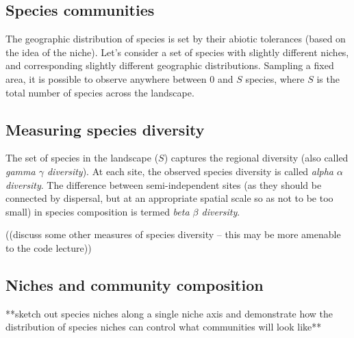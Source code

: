 \documentclass[12pt]{article}
\begin{document}
\clearpage
\subsection*{Species communities}


The geographic distribution of species is set by their abiotic tolerances (based on the idea of the niche). Let's consider a set of species with slightly different niches, and corresponding slightly different geographic distributions. Sampling a fixed area, it is possible to observe anywhere between 0 and $S$ species, where $S$ is the total number of species across the landscape. 













\subsection*{Measuring species diversity}

The set of species in the landscape ($S$) captures the regional diversity (also called \textit{gamma $\gamma$ diversity}). At each site, the observed species diversity is called \textit{alpha $\alpha$ diversity}. The difference between semi-independent sites (as they should be connected by dispersal, but at an appropriate spatial scale so as not to be too small) in species composition is termed \textit{beta $\beta$ diversity}.


((discuss some other measures of species diversity -- this may be more amenable to the code lecture))


















\subsection*{Niches and community composition}

**sketch out species niches along a single niche axis and demonstrate how the distribution of species niches can control what communities will look like**
\end{document}
